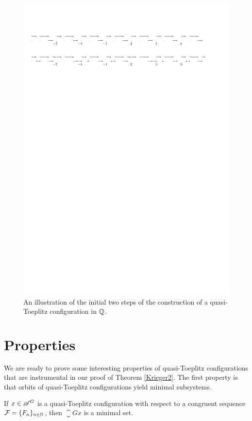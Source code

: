 \begin{figure}
\centering
\includegraphics[scale=0.8]{../Graphics/toeplitzQ2}
\caption{An illustration of the initial two steps of the construction of a quasi-Toeplitz configuration in $\mathbb{Q}$. }\label{fig:toeplitzQ}
\end{figure}


\section{Properties}
We are ready to prove some interesting properties of quasi-Toeplitz configurations that are instrumental in our proof of Theorem \ref{Krieger2}. 
%
The first property is that orbits of quasi-Toeplitz configurations yield minimal subsystems.
\begin{lem}\label{lem:toeplitz-minimal}
If $x\in\mathscr{A}^G$ is a quasi-Toeplitz configuration with respect to a congruent \Folner sequence  $\operatorname{\mathcal{F}}=\{F_n\}_{n\in\mathbb{N}}$, then $\closure{Gx}$ is a minimal set.
\end{lem}

